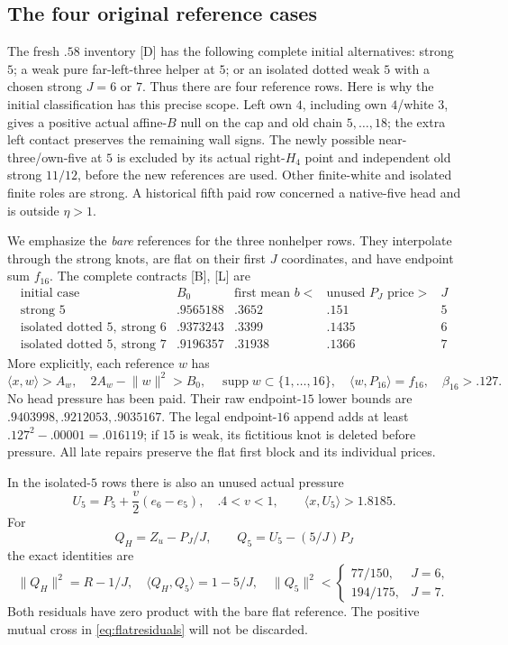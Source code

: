 \documentclass[11pt]{article}
\theoremstyle{definition}
\theoremstyle{remark}
\newcommand{\ip}[2]{\langle #1,#2\rangle}
\newcommand{\norm}[1]{\lVert #1\rVert}
\newcommand{\src}[1]{\textnormal{\textsf{[#1]}}}
\begin{document}
\subsection{The four original reference cases}
\label{subsec:fourrefs}

The fresh \(.58\) inventory \src{D} has the following complete
initial alternatives: strong \(5\); a weak pure far-left-three
helper at \(5\); or an isolated dotted weak \(5\) with a chosen
strong \(J=6\) or \(7\). Thus there are four reference rows.
Here is why the initial classification has this precise scope.
Left own \(4\), including own \(4\)/white \(3\), gives a positive
actual affine-\(B\) null on the cap and old chain \(5,\ldots,18\);
the extra left contact preserves the remaining wall signs.
The newly possible near-three/own-five at \(5\) is excluded by
its actual right-\(H_4\) point and independent old strong
\(11/12\), before the new references are used. Other finite-white
and isolated finite roles are strong. A historical fifth paid
row concerned a native-five head and is outside \(\eta>1\).

We emphasize the \emph{bare} references for the three nonhelper
rows. They interpolate through the strong knots, are flat on
their first \(J\) coordinates, and have endpoint sum \(f_{16}\).
The complete contracts \src{B}, \src{L} are
\[
\begin{array}{c|c|c|c|c}
\text{initial case}&B_0&\text{first mean }b<
 &\text{unused }P_J\text{ price}>&J\\ \hline
\text{strong }5&.9565188&.3652&.151&5\\
\text{isolated dotted }5,\ \text{strong }6&.9373243&.3399&.1435&6\\
\text{isolated dotted }5,\ \text{strong }7&.9196357&.31938&.1366&7
\end{array}
\]
More explicitly, each reference \(w\) has
\[
 \ip{x}{w}>A_w,\quad 2A_w-\norm{w}^2>B_0,\quad
 \operatorname{supp}w\subset\{1,\ldots,16\},\quad
 \ip{w}{P_{16}}=f_{16},\quad \beta_{16}>.127.
\]
No head pressure has been paid. Their raw endpoint-\(15\)
lower bounds are \(.9403998,.9212053,.9035167\).
The legal endpoint-\(16\) append adds at least
\(.127^2-.00001=.016119\); if \(15\) is weak, its fictitious
knot is deleted before pressure. All late repairs preserve the
flat first block and its individual prices.

In the isolated-\(5\) rows there is also an unused actual pressure
\[
 U_5=P_5+\frac v2(e_6-e_5),\quad .4<v<1,\qquad
 \ip{x}{U_5}>1.8185.
\]
For
\[
 Q_H=Z_u-P_J/J,\qquad Q_5=U_5-(5/J)P_J
\]
the exact identities are
\begin{equation}
\label{eq:flatresiduals}
 \norm{Q_H}^2=R-1/J,\quad
 \ip{Q_H}{Q_5}=1-5/J,\quad
 \norm{Q_5}^2<
 \begin{cases}77/150,&J=6,\\194/175,&J=7.\end{cases}
\end{equation}
Both residuals have zero product with the bare flat reference.
The positive mutual cross in \eqref{eq:flatresiduals} will
not be discarded.
\end{document}
